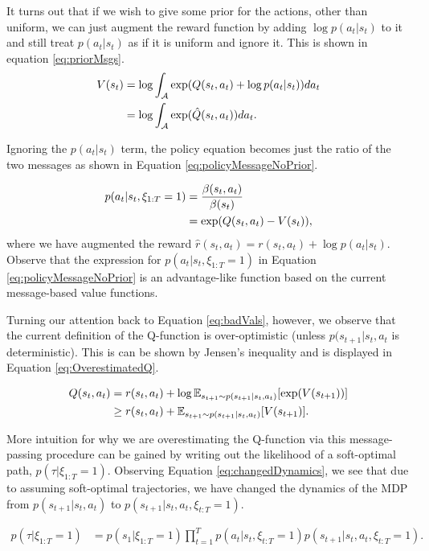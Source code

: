\documentclass{report}
\numberwithin{equation}{section}
\numberwithin{figure}{section}
\numberwithin{table}{section}
\numberwithin{algorithm}{section}
\begin{document}
It turns out that if we wish to give some prior for the actions, 
other than uniform, we can just augment the reward function 
by adding $\log p(a_t|s_t)$ to it and still treat $p(a_t|s_t)$ 
as if it is uniform and ignore it. This is shown in equation 
\ref{eq:priorMsgs}.
\begin{align}\label{eq:priorMsgs}
  V(s_t)&=\log \int_{\mathcal{A}}\exp (Q(s_t, a_t) + \log p(a_t|s_t))da_t\notag\\
  &=\log \int_{\mathcal{A}}\exp (\hat{Q}(s_t, a_t))da_t.
\end{align}

Ignoring the $p(a_t|s_t)$ term, 
the policy equation becomes just the ratio 
of the two messages as shown in Equation \ref{eq:policyMessageNoPrior}.

\begin{align}\label{eq:policyMessageNoPrior}
  p(a_t|s_t, \xi_{1:T}=1)&=\frac{\beta(s_t, a_t)}{\beta(s_t)}\notag\\
  &=\exp(Q(s_t, a_t) - V(s_t)),
\end{align}
where we have augmented the reward $\hat{r}(s_t, a_t)=r(s_t,a_t) + \log p(a_t|s_t)$.
Observe that the expression for $p(a_t|s_t,\xi_{1:T}=1)$ in Equation 
\ref{eq:policyMessageNoPrior} is an advantage-like function based on 
the current message-based value functions.

Turning our attention back to Equation \ref{eq:badVals}, however, 
we observe that the current definition of the Q-function is 
over-optimistic (unless $p(s_{t+1}|s_t,a_t$ is deterministic). 
This is can be shown by Jensen's inequality and 
is displayed in Equation \ref{eq:OverestimatedQ}.

\begin{align}\label{eq:OverestimatedQ}
  Q(s_t,a_t)&=r(s_t, a_t) + \log\mathbb{E}_{s_{t+1}\sim p(s_{t+1}|s_t, a_t)}[\exp (V(s_{t+1}))]\notag\\
  &\ge r(s_t, a_t) + \mathbb{E}_{s_{t+1}\sim p(s_{t+1}|s_t, a_t)}[V(s_{t+1})].
\end{align}

More intuition for why we are overestimating the Q-function 
via this message-passing procedure can be gained by writing 
out the likelihood of a soft-optimal path, $p(\tau|\xi_{1:T}=1)$. 
Observing Equation \ref{eq:changedDynamics}, we see that due to 
assuming soft-optimal trajectories, we have changed the dynamics 
of the MDP from $p(s_{t+1}|s_t, a_t)$ to $p(s_{t+1}| s_t,a_t,\xi_{t:T}=1)$.

\begin{align}\label{eq:changedDynamics}
  p(\tau|\xi_{1:T}=1)&=p(s_1|\xi_{1:T}=1)\prod_{t=1}^Tp(a_t|s_t,\xi_{t:T}=1)p(s_{t+1}|s_t, a_t, \xi_{t:T}=1).
\end{align}
\end{document}
